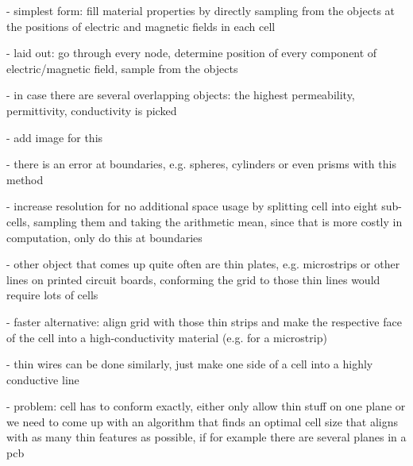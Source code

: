 \documentclass[]{report}
\begin{document}
- simplest form: fill material properties by directly sampling from the objects at the positions of electric and magnetic fields in each cell

- laid out: go through every node, determine position of every component of electric/magnetic field, sample from the objects

- in case there are several overlapping objects: the highest permeability, permittivity, conductivity is picked

- add image for this

- there is an error at boundaries, e.g. spheres, cylinders or even prisms with this method

- increase resolution for no additional space usage by splitting cell into eight sub-cells, sampling them and taking the arithmetic mean, since that is more costly in computation, only do this at boundaries

- other object that comes up quite often are thin plates, e.g. microstrips or other lines on printed circuit boards, conforming the grid to those thin lines would require lots of cells

- faster alternative: align grid with those thin strips and make the respective face of the cell into a high-conductivity material (e.g. for a microstrip)

- thin wires can be done similarly, just make one side of a cell into a highly conductive line

- problem: cell has to conform exactly, either only allow thin stuff on one plane or we need to come up with an algorithm that finds an optimal cell size that aligns with as many thin features as possible, if for example there are several planes in a pcb
\end{document}
